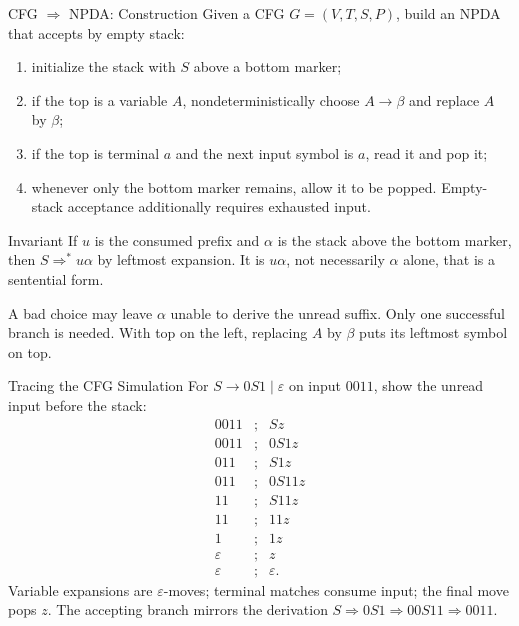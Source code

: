 \documentclass[10pt]{beamer}
\begin{document}
\begin{frame}{CFG $\Rightarrow$ NPDA: Construction}
  \small
  Given a CFG $G=(V,T,S,P)$, build an NPDA that accepts by empty stack:
  \begin{enumerate}
    \item initialize the stack with $S$ above a bottom marker;
    \item if the top is a variable $A$, nondeterministically choose $A\to\beta$ and replace $A$ by $\beta$;
    \item if the top is terminal $a$ and the next input symbol is $a$, read it and pop it;
    \item whenever only the bottom marker remains, allow it to be popped.
      Empty-stack acceptance additionally requires exhausted input.
  \end{enumerate}
  \pause
  \begin{block}{Invariant}
    If $u$ is the consumed prefix and $\alpha$ is the stack above the bottom
    marker, then $S\Rightarrow^*u\alpha$ by leftmost expansion.
    It is $u\alpha$, not necessarily $\alpha$ alone, that is a sentential form.
  \end{block}
  A bad choice may leave $\alpha$ unable to derive the unread suffix.
  Only one successful branch is needed. With top on the left, replacing
  $A$ by $\beta$ puts its leftmost symbol on top.
\end{frame}

\begin{frame}{Tracing the CFG Simulation}
  For $S\to0S1\mid\varepsilon$ on input $0011$, show the unread input before the stack:
  \[
  \begin{array}{ccl}
    0011 &;& Sz\\
    0011 &;& 0S1z\\
    011  &;& S1z\\
    011  &;& 0S11z\\
    11   &;& S11z\\
    11   &;& 11z\\
    1    &;& 1z\\
    \varepsilon &;& z\\
    \varepsilon &;& \varepsilon.
  \end{array}
  \]
  \pause
  Variable expansions are $\varepsilon$-moves; terminal matches consume input; the final move pops $z$.
  The accepting branch mirrors the derivation
  $S\Rightarrow0S1\Rightarrow00S11\Rightarrow0011$.
\end{frame}
\end{document}
